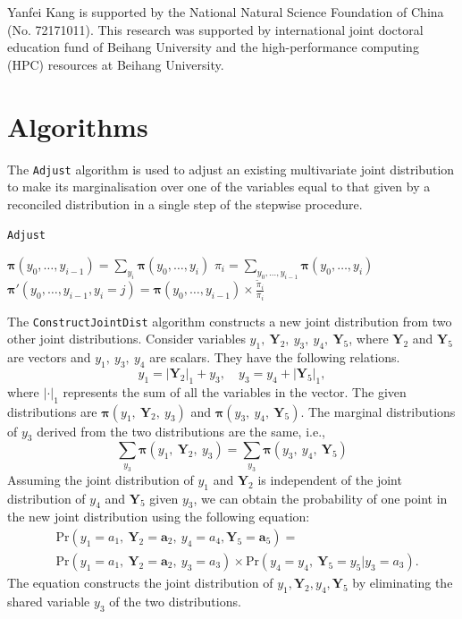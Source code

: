 \documentclass[a4paper,review,12pt,authoryear]{elsarticle}
\let\code=\texttt
\newcommand{\bY}{\mathbf{Y}}
\newcommand{\bpi}{\bm{\pi}}
\theoremstyle{definition}
\begin{document}
Yanfei Kang is supported by the National Natural Science Foundation of China (No. 72171011). This research was supported by international joint doctoral
education fund of Beihang University and the high-performance computing (HPC) resources at Beihang University.


\begingroup
{}


\endgroup

\newpage

\appendix

\section{Algorithms}
\label{appendix:adjust}

The \code{Adjust} algorithm is used to adjust an existing multivariate joint distribution to make its marginalisation over one of the variables equal to that given by a reconciled distribution in a single step of the stepwise procedure.

\begin{algorithm}[H]
  \label{alg:adjust}
  \caption{\code{Adjust}}
  \Input{$\bpi(y_0,y_1,\dots,y_i), \tilde\pi_i, y_i \in \{0,1,\dots,k_i\}$}

  $\bpi(y_0,\dots,y_{i-1}) = \sum_{y_i}\bpi(y_0,\dots,y_i)$\;
  $\pi_i = \sum_{y_0,\dots,y_{i-1}}\bpi(y_0,\dots,y_i)$ \;
   {
    $\bpi'(y_0,\dots,y_{i-1}, y_i=j) = \bpi(y_0,\dots,y_{i-1}) \times \frac{\tilde\pi_i}{\pi_i}$ \;
  }

  \Output{$\bpi'(y_0,\dots,y_i)$}

 \end{algorithm}


 The \code{ConstructJointDist} algorithm constructs a new joint distribution from two other joint distributions.
 Consider variables $y_1, ~ \bY_2, ~ y_3, ~ y_4, ~ \bY_5$, where $\bY_2$ and $\bY_5$ are vectors and $y_1, ~ y_3, ~ y_4$ are scalars.
 They have the following relations.
 \[
  y_1 = |\bY_2|_1 + y_3, \quad y_3 = y_4 + |\bY_5|_1,
 \]
 where $|\cdot|_1$ represents the sum of all the variables in the vector.
 The given distributions are $\bpi(y_1, ~ \bY_2, ~ y_3)$ and $\bpi(y_3, ~ y_4, ~ \bY_5)$.
 The marginal distributions of $y_3$ derived from the two distributions are the same, i.e.,
 \[
  \sum_{y_3} \bpi(y_1, ~ \bY_2, ~ y_3) = \sum_{y_3}\bpi(y_3, ~ y_4, ~ \bY_5)
\]
 Assuming the joint distribution of $y_1$ and $\bY_2$ is independent of the joint distribution of $y_4$ and $\bY_5$ given $y_3$, we can obtain the probability of one point in the new joint distribution using the following equation: \[
   \begin{aligned}
  &\text{Pr}(y_1=a_1, ~ \bY_2=\mathbf{a}_2, ~ y_4=a_4, \bY_5 = \mathbf{a}_5) =\\ &\text{Pr} (y_1=a_1, ~ \bY_2=\mathbf{a}_2, ~ y_3=a_3) \times \text{Pr}(y_4=y_4, ~ \bY_5=y_5|y_3=a_3).
   \end{aligned}
 \]
 The equation constructs the joint distribution of $y_1, \bY_2, y_4, \bY_5$ by eliminating the shared variable $y_3$ of the two distributions.
\end{document}
